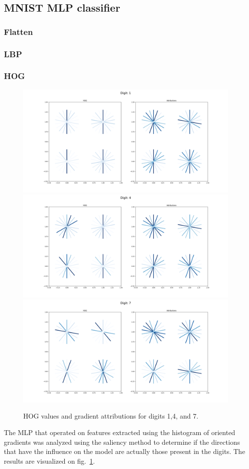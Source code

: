 \documentclass[journal, a4paper]{IEEEtran}
\begin{document}
\subsection{MNIST MLP classifier}\label{subsec:experiment-mnist-mlp}

\subsubsection{Flatten}
\subsubsection{LBP}
\subsubsection{HOG}

\begin{figure}[ht]\centering
    \includegraphics[width=.6\linewidth]{img/saliency_hog/1.png}
    \includegraphics[width=.6\linewidth]{img/saliency_hog/4.png}
    \includegraphics[width=.6\linewidth]{img/saliency_hog/7.png}
    \caption{HOG values and gradient attributions for digits 1,4, and 7.}\label{fig:hog-attributions}
\end{figure}

The MLP that operated on features extracted using the histogram of oriented gradients was analyzed using the saliency method to determine 
if the directions that have the influence on the model are actually those present in the digits.
The results are visualized on fig.~\ref{fig:hog-attributions}.
\end{document}
